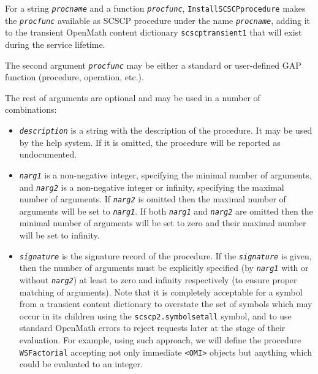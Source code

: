 \documentclass[a4paper,11pt]{report}
\begin{document}
{{{ For a string \mbox{\texttt{\mdseries\slshape procname}} and a function \mbox{\texttt{\mdseries\slshape procfunc}}, \texttt{InstallSCSCPprocedure} makes the \mbox{\texttt{\mdseries\slshape procfunc}} available as SCSCP procedure under the name \mbox{\texttt{\mdseries\slshape procname}}, adding it to the transient \textsf{OpenMath} content dictionary \texttt{scscp{\textunderscore}transient{\textunderscore}1} that will exist during the service lifetime. 

 The second argument \mbox{\texttt{\mdseries\slshape procfunc}} may be either a standard or user-defined \textsf{GAP} function (procedure, operation, etc.). 

 The rest of arguments are optional and may be used in a number of
combinations: 
\begin{itemize}
\item  \mbox{\texttt{\mdseries\slshape description}} is a string with the description of the procedure. It may be used by the help
system. If it is omitted, the procedure will be reported as undocumented. 
\item  \mbox{\texttt{\mdseries\slshape narg1}} is a non-negative integer, specifying the minimal number of arguments, and \mbox{\texttt{\mdseries\slshape narg2}} is a non-negative integer or infinity, specifying the maximal number of
arguments. If \mbox{\texttt{\mdseries\slshape narg2}} is omitted then the maximal number of arguments will be set to \mbox{\texttt{\mdseries\slshape narg1}}. If both \mbox{\texttt{\mdseries\slshape narg1}} and \mbox{\texttt{\mdseries\slshape narg2}} are omitted then the minimal number of arguments will be set to zero and their
maximal number will be set to infinity. 
\item  \mbox{\texttt{\mdseries\slshape signature}} is the signature record of the procedure. If the \mbox{\texttt{\mdseries\slshape signature}} is given, then the number of arguments must be explicitly specified (by \mbox{\texttt{\mdseries\slshape narg1}} with or without \mbox{\texttt{\mdseries\slshape narg2}}) at least to zero and infinity respectively (to ensure proper matching of
arguments). Note that it is completely acceptable for a symbol from a
transient content dictionary to overstate the set of symbols which may occur
in its children using the \texttt{scscp2.symbol{\textunderscore}set{\textunderscore}all} symbol, and to use standard \textsf{OpenMath} errors to reject requests later at the stage of their evaluation. For example,
using such approach, we will define the procedure \texttt{WS{\textunderscore}Factorial} accepting not only immediate \texttt{{\textless}OMI{\textgreater}} objects but anything which could be evaluated to an integer. 


\end{itemize}}}}
\end{document}

